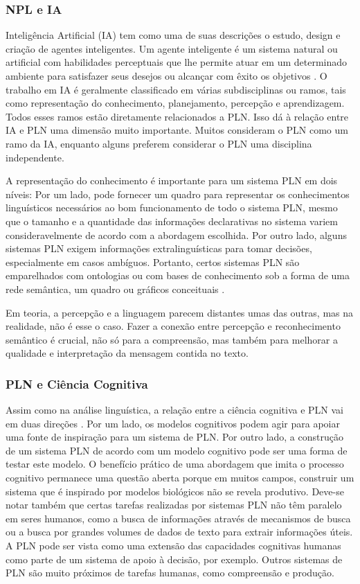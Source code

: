 \documentclass[
	12pt,				%
	openright,			%
	oneside,			%
	a4paper,			%
	english,			%
	spanish,			%
	brazil				%
	]{abntex2}
\begin{document}
	\subsubsection*{NPL e IA}
	Inteligência Artificial (IA) tem como uma de suas descrições o estudo, design e criação de agentes inteligentes. Um agente inteligente é um sistema natural ou artificial com habilidades perceptuais que lhe permite atuar em um determinado ambiente para satisfazer seus desejos ou alcançar com êxito os objetivos \cite{norvig3rd}. O trabalho em IA é geralmente classificado em várias subdisciplinas ou ramos, tais como representação do conhecimento, planejamento, percepção e aprendizagem. Todos esses ramos estão diretamente relacionados a PLN. Isso dá à relação entre IA e PLN uma dimensão muito importante. Muitos consideram o PLN como um ramo da IA, enquanto alguns preferem considerar o PLN uma disciplina independente. 

	
A representação do conhecimento é importante para um sistema PLN em dois níveis: Por um lado, pode fornecer um quadro para representar os conhecimentos linguísticos necessários ao bom funcionamento de todo o sistema PLN, mesmo que o tamanho e a quantidade das informações declarativas no sistema variem consideravelmente de acordo com a abordagem escolhida. Por outro lado, alguns sistemas PLN exigem informações extralinguísticas para tomar decisões, especialmente em casos ambíguos. Portanto, certos sistemas PLN são emparelhados com ontologias ou com bases de conhecimento sob a forma de uma rede semântica, um quadro ou gráficos conceituais \cite{book_natural_lang}.

Em teoria, a percepção e a linguagem parecem distantes umas das outras, mas na realidade, não é esse o caso. Fazer a conexão entre percepção e reconhecimento semântico é crucial, não só para a compreensão, mas também para melhorar a qualidade e interpretação da mensagem contida no texto. 

	\subsubsection*{PLN e Ciência Cognitiva}
	Assim como na análise linguística, a relação entre a ciência cognitiva e PLN vai em duas direções \cite{book_natural_lang}. Por um lado, os modelos cognitivos podem agir para apoiar uma fonte de inspiração para um sistema de PLN. Por outro lado, a construção de um sistema PLN de acordo com um modelo cognitivo pode ser uma forma de testar este modelo. O benefício prático de uma abordagem que imita o processo cognitivo permanece uma questão aberta porque em muitos campos, construir um sistema que é inspirado por modelos biológicos não se revela produtivo. Deve-se notar também que certas tarefas realizadas por sistemas PLN não têm paralelo em seres humanos, como a busca de informações através de mecanismos de busca ou a busca por grandes volumes de dados de texto para extrair informações úteis. A PLN pode ser vista como uma extensão das capacidades cognitivas humanas como parte de um sistema de apoio à decisão, por exemplo. Outros sistemas de PLN são muito próximos de tarefas humanas, como compreensão e produção.
	
\end{document}
